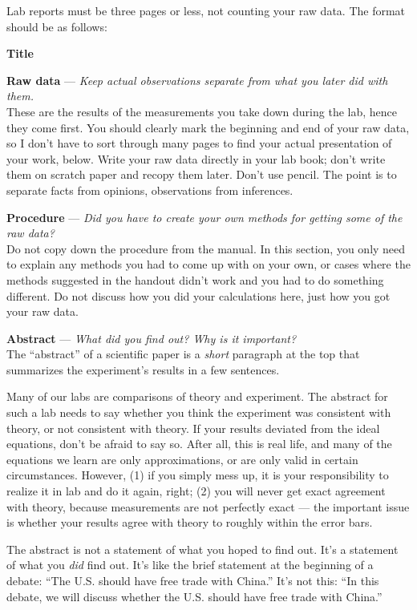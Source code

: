 
	Lab reports must be three pages or less, not counting your
raw data. The format should be as follows: 
\label{format-really-here}

\textbf{Title}

\textbf{Raw data} --- \emph{Keep actual observations separate from what you
later did with them.}\\
These are the results of the measurements you take down
during the lab, hence they come first. You should clearly
mark the beginning and end of your raw data, so I don't have
to sort through many pages to find your actual presentation
of your work, below. Write your raw data directly in your
lab book; don't write them on scratch paper and recopy them
later. Don't use pencil. The point is to separate facts from
opinions, observations from inferences.

\textbf{Procedure} --- \emph{Did you have to create your own methods for
getting some of the raw data?}\\
Do not copy down the procedure from the manual. In this
section, you only need to explain any methods you had to
come up with on your own, or cases where the methods
suggested in the handout didn't work and you had to do
something different. Do not discuss how you did your
calculations here, just how you got your raw data.

\textbf{Abstract} --- \emph{What did you find out? Why is it important?}\\
The ``abstract'' of a scientific paper is a \emph{short} paragraph
at the top that summarizes the experiment's results in a few
sentences. 

Many of our labs are comparisons of theory and experiment. The abstract
for such a lab needs to say whether you think the experiment was consistent
with theory, or not consistent with theory.
If your results deviated from the ideal equations, don't be afraid
to say so.
After all, this is real life, and many of the equations we
learn are only approximations, or are only valid in certain
circumstances. However, (1) if you simply mess up, it is
your responsibility to realize it in lab and do it again,
right; (2) you will never get exact agreement with theory,
because measurements are not perfectly exact --- the
important issue is whether your results agree with theory to
roughly within the error bars.

The abstract is not a statement of what you hoped to find out. It's
a statement of what you \emph{did} find out. It's like the brief statement
at the beginning of a debate: ``The U.S. should have free trade with China.''
It's not this: ``In this debate, we will discuss whether the U.S. should have
free trade with China.''

